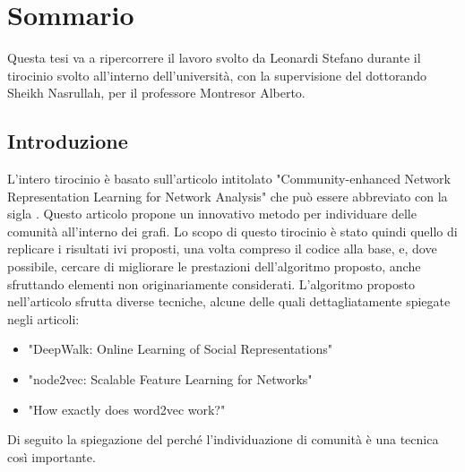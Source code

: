 %
%
%
\chapter{Sommario}
Questa tesi va a ripercorrere il lavoro svolto da Leonardi Stefano durante il tirocinio svolto all'interno dell'università, con la supervisione del dottorando Sheikh Nasrullah, per il professore Montresor Alberto.
%
\section{Introduzione}
L'intero tirocinio è basato sull'articolo intitolato "Community-enhanced Network Representation Learning for Network Analysis" che può essere abbreviato con la sigla \cnrl. Questo articolo propone un innovativo metodo per individuare delle comunità all'interno dei grafi. Lo scopo di questo tirocinio è stato quindi quello di replicare i risultati ivi proposti, una volta compreso il codice alla base, e, dove possibile, cercare di migliorare le prestazioni dell'algoritmo proposto, anche sfruttando elementi non originariamente considerati.\newline
L'algoritmo proposto nell'articolo sfrutta diverse tecniche, alcune delle quali dettagliatamente spiegate negli articoli:
\begin{itemize}
	\item "DeepWalk: Online Learning of Social Representations"
	\item "node2vec: Scalable Feature Learning for Networks"
	\item "How exactly does word2vec work?"
\end{itemize} 
Di seguito la spiegazione del perché l'individuazione di comunità è una tecnica così importante.
%
